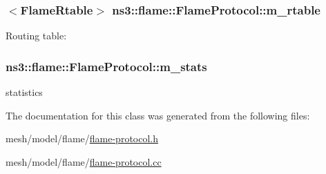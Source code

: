 \subsubsection[{\texorpdfstring{m\+\_\+rtable}{m_rtable}}]{$<${\bf Flame\+Rtable}$>$ ns3\+::flame\+::\+Flame\+Protocol\+::m\+\_\+rtable\hspace{0.3cm}{\ttfamily [private]}}\hypertarget{classns3_1_1flame_1_1FlameProtocol_a6165f21594140afd0df03510fb61eb33}{}\label{classns3_1_1flame_1_1FlameProtocol_a6165f21594140afd0df03510fb61eb33}


Routing table\+: 

\subsubsection[{\texorpdfstring{m\+\_\+stats}{m_stats}}]{ ns3\+::flame\+::\+Flame\+Protocol\+::m\+\_\+stats\hspace{0.3cm}{\ttfamily [private]}}\hypertarget{classns3_1_1flame_1_1FlameProtocol_a9f33727e9f2483dc9d929a7a82956e0c}{}\label{classns3_1_1flame_1_1FlameProtocol_a9f33727e9f2483dc9d929a7a82956e0c}


statistics 



The documentation for this class was generated from the following files\+:\begin{DoxyCompactItemize}
\item 
mesh/model/flame/\hyperlink{flame-protocol_8h}{flame-\/protocol.\+h}\item 
mesh/model/flame/\hyperlink{flame-protocol_8cc}{flame-\/protocol.\+cc}\end{DoxyCompactItemize}
